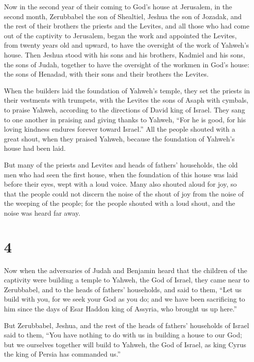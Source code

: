  Now in the second year of their coming to God's house at
Jerusalem, in the second month, Zerubbabel the son of Shealtiel, Jeshua
the son of Jozadak, and the rest of their brothers the priests and the
Levites, and all those who had come out of the captivity to Jerusalem,
began the work and appointed the Levites, from twenty years old and
upward, to have the oversight of the work of Yahweh's house.
 Then Jeshua stood with his sons and his brothers, Kadmiel
and his sons, the sons of Judah, together to have the oversight of the
workmen in God's house: the sons of Henadad, with their sons and their
brothers the Levites.

 When the builders laid the foundation of Yahweh's temple,
they set the priests in their vestments with trumpets, with the Levites
the sons of Asaph with cymbals, to praise Yahweh, according to the
directions of David king of Israel.  They sang to one
another in praising and giving thanks to Yahweh, ``For he is good, for
his loving kindness endures forever toward Israel.'' All the people
shouted with a great shout, when they praised Yahweh, because the
foundation of Yahweh's house had been laid.

 But many of the priests and Levites and heads of fathers'
households, the old men who had seen the first house, when the
foundation of this house was laid before their eyes, wept with a loud
voice. Many also shouted aloud for joy,  so that the people
could not discern the noise of the shout of joy from the noise of the
weeping of the people; for the people shouted with a loud shout, and the
noise was heard far away.

\hypertarget{section-3}{%
\section{4}\label{section-3}}

 Now when the adversaries of Judah and Benjamin heard that
the children of the captivity were building a temple to Yahweh, the God
of Israel,  they came near to Zerubbabel, and to the heads
of fathers' households, and said to them, ``Let us build with you, for
we seek your God as you do; and we have been sacrificing to him since
the days of Esar Haddon king of Assyria, who brought us up here.''

 But Zerubbabel, Jeshua, and the rest of the heads of
fathers' households of Israel said to them, ``You have nothing to do
with us in building a house to our God; but we ourselves together will
build to Yahweh, the God of Israel, as king Cyrus the king of Persia has
commanded us.''

